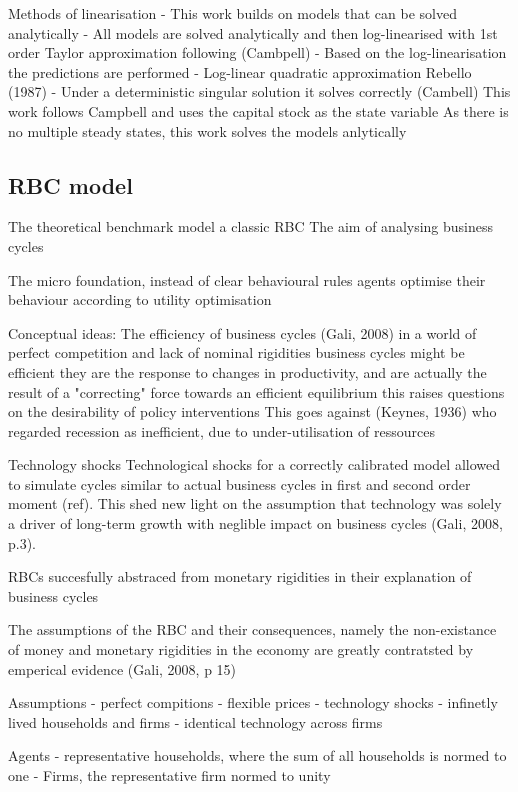 \documentclass[12pt,a4paper,english]{article} %
\begin{document}
	Methods of linearisation
	-	This work builds on models that can be solved analytically
	- All models are solved analytically and then log-linearised with 1st order Taylor approximation following (Cambpell)
	- Based on the log-linearisation the predictions are performed
	- Log-linear quadratic approximation Rebello (1987)
	- Under a deterministic singular solution it solves correctly (Cambell)
	This work follows Campbell and uses the capital stock as the state variable
	As there is no multiple steady states, this work solves the models anlytically
	
	
	\subsection{RBC model}
	The theoretical benchmark model a classic RBC 
	The aim of analysing business cycles
	
	The micro foundation, instead of clear behavioural rules agents optimise their behaviour according to utility optimisation
	
	Conceptual ideas:
	The efficiency of business cycles (Gali, 2008)
	in a world of perfect competition and lack of nominal rigidities business cycles might be efficient
	they are the response to changes in productivity, and are actually the result of a "correcting" force towards an efficient equilibrium
	this raises questions on the desirability of policy interventions
	This goes against (Keynes, 1936) who regarded recession as inefficient, due to under-utilisation of ressources
	
	Technology shocks
	Technological shocks for a correctly calibrated model allowed to simulate cycles similar to actual business cycles in first and second order moment (ref). This shed new light on the assumption that technology was solely a driver of long-term growth with neglible impact on business cycles (Gali, 2008, p.3).
	
	RBCs succesfully abstraced from monetary rigidities in their explanation of business cycles
	
	The assumptions of the RBC and their consequences, namely the non-existance of money and monetary rigidities in the economy are greatly contratsted by emperical evidence (Gali, 2008, p 15)
	
		
	
	Assumptions
	- perfect compitions
	- flexible prices
	- technology shocks
	- infinetly lived households and firms
	- identical technology across firms
	
	Agents
	- representative households, where the sum of all households is normed to one
	- Firms, the representative firm normed to unity
	
\end{document}
